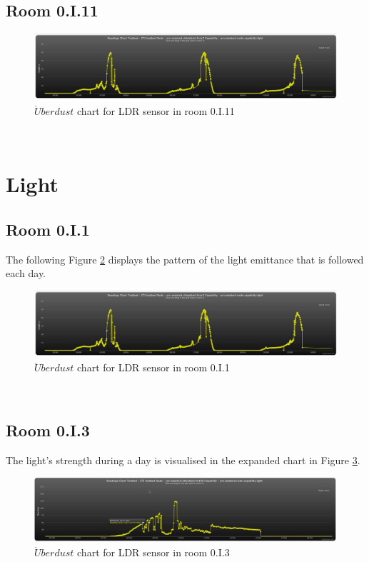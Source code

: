 \documentclass[12pt,a4paper]{report}
\begin{document}
\subsection{Room 0.I.11}
%
\begin{figure}[H]
\centering
	\includegraphics*[width=\textwidth]{light_1}
	\caption{$\ddot{U}berdust$ chart for LDR sensor in room 0.I.11}
	\label{chart_light_1}
\end{figure}
\ \\
%
\section{Light}
%
\subsection{Room 0.I.1}
%
The following Figure \ref{chart_light_1} displays the pattern of the light emittance that is followed each day.
\begin{figure}[H]
\centering
	\includegraphics*[width=\textwidth]{light_1}
	\caption{$\ddot{U}berdust$ chart for LDR sensor in room 0.I.1}
	\label{chart_light_1}
\end{figure}
\ \\
%
\subsection{Room 0.I.3}
%
The light's strength during a day is visualised in the expanded chart in Figure \ref{chart_light_3}.
\begin{figure}[H]
\centering
	\includegraphics*[width=\textwidth]{light_3}
	\caption{$\ddot{U}berdust$ chart for LDR sensor in room 0.I.3}
	\label{chart_light_3}
\end{figure}
\ \\
%
\end{document}

